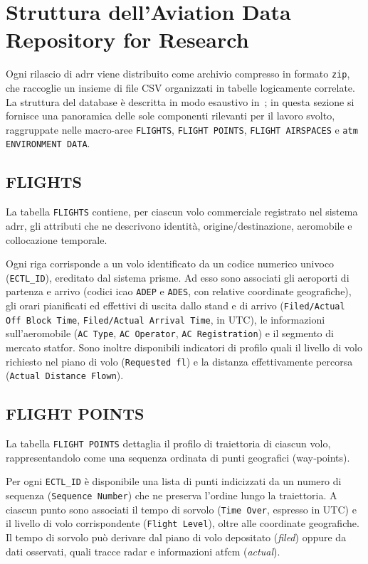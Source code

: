 \section{Struttura dell'Aviation Data Repository for Research}
Ogni rilascio di \gls{adrr} viene distribuito come archivio compresso in formato \texttt{zip}, che raccoglie un insieme di file CSV organizzati in tabelle logicamente correlate.  
La struttura del database è descritta in modo esaustivo in~\cite{rnd2023}; in questa sezione si fornisce una panoramica delle sole componenti rilevanti per il lavoro svolto, raggruppate nelle macro-aree \texttt{FLIGHTS}, \texttt{FLIGHT POINTS}, \texttt{FLIGHT AIRSPACES} e \texttt{\gls{atm} ENVIRONMENT DATA}.

\subsection{FLIGHTS}
\label{sec:flights}
La tabella \texttt{FLIGHTS} contiene, per ciascun volo commerciale registrato nel sistema \gls{adrr}, gli attributi che ne descrivono identità, origine/destinazione, aeromobile e collocazione temporale.

Ogni riga corrisponde a un volo identificato da un codice numerico univoco (\texttt{ECTL\_ID}), ereditato dal sistema \gls{prisme}. Ad esso sono associati gli aeroporti di partenza e arrivo (codici \gls{icao} \texttt{ADEP} e \texttt{ADES}, con relative coordinate geografiche), gli orari pianificati ed effettivi di uscita dallo stand e di arrivo (\texttt{Filed/Actual Off Block Time}, \texttt{Filed/Actual Arrival Time}, in UTC), le informazioni sull’aeromobile (\texttt{AC Type}, \texttt{AC Operator}, \texttt{AC Registration}) e il segmento di mercato \gls{statfor}.  
Sono inoltre disponibili indicatori di profilo quali il livello di volo richiesto nel piano di volo (\texttt{Requested \gls{fl}}) e la distanza effettivamente percorsa (\texttt{Actual Distance Flown}).

\subsection{FLIGHT POINTS}
\label{sec:flight_points}
La tabella \texttt{FLIGHT POINTS} dettaglia il profilo di traiettoria di ciascun volo, rappresentandolo come una sequenza ordinata di punti geografici (way‐points).

Per ogni \texttt{ECTL\_ID} è disponibile una lista di punti indicizzati da un numero di sequenza (\texttt{Sequence Number}) che ne preserva l’ordine lungo la traiettoria. A ciascun punto sono associati il tempo di sorvolo (\texttt{Time Over}, espresso in UTC) e il livello di volo corrispondente (\texttt{Flight Level}), oltre alle coordinate geografiche.  
Il tempo di sorvolo può derivare dal piano di volo depositato (\emph{filed}) oppure da dati osservati, quali tracce radar e informazioni \gls{atfcm} (\emph{actual}).
